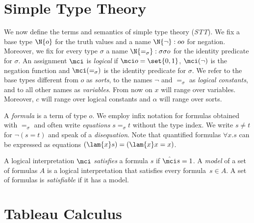 \section{Simple Type Theory}

We now define the terms and semantics of simple type theory (\emph{STT}).
We fix a base type $\N{o}$ for the truth values and a
name $\N{\neg}:oo$ for negation.
Moreover, we fix for every type
$\sigma$ a name $\N{=_\sigma}:\sigma\sigma o$ for the
identity predicate for $\sigma$.
An assignment
$\mci$ is \emph{logical} if $\mci o=\set{0,1}$,
$\mci(\neg)$ is the negation
function and $\mci(=_\sigma)$ is the identity
predicate for $\sigma$.
We refer to the base types
different from $o$ as \emph{sorts}, to the names
$\neg$ and $=_\sigma$ as \emph{logical constants}, 
and to all other names as \emph{variables}.  
From now on \emph{$x$} will range
over variables. Moreover, \emph{$c$} will range over logical constants
and \emph{$\alpha$} will range over sorts.

A \emph{formula} is a term of type $o$.  We employ
infix notation for formulas obtained with 
$=_\sigma$ and often write \emph{equations} $s=_\sigma
t$ without the type index.  
We write \emph{$s\neq t$} for $\neg (s{=}t)$
and speak of a \emph{disequation}.
Note that
quantified formulas $\forall x.s$ can be expressed as
equations $(\lam{x}s)=(\lam{x}x=x)$.

A logical interpretation $\mci$ \emph{satisfies}
a formula $s$ if $\hat\mci s=1$.  A \emph{model} of a
set of formulas $A$ is a logical interpretation
that satisfies every formula~$s\in A$.  A set of
formulas is \emph{satisfiable} if it has a model.

\section{Tableau Calculus}

